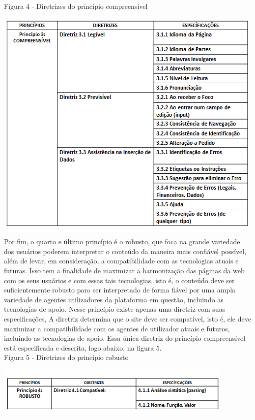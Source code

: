 \documentclass[a4paper]{article}
\begin{document}
\begin{titlepage}
Figura 4 - Diretrizes do princípio compreensível\\[-0.7cm]
\begin{center}
	\parbox{11cm}{\includegraphics[scale=0.8]{Compreensível.png}}
\end{center}

Por fim, o quarto e último princípio é o robusto, que foca na grande variedade dos usuários poderem interpretar o conteúdo da maneira mais confiável possível, além de levar, em consideração, a compatibilidade com as tecnologias atuais e futuras. Isso tem a finalidade de maximizar a harmonização das páginas da web com os seus usuários e com essas tais tecnologias, isto é, o conteúdo deve ser suficientemente robusto para ser interpretado de forma fiável por uma ampla variedade de agentes utilizadores da plataforma em questão, incluindo as tecnologias de apoio. Nesse princípio existe apenas uma diretriz com suas especificações, A diretriz determina que o site deve ser compatível, isto é, ele deve maximizar a compatibilidade com os agentes de utilizador atuais e futuros, incluindo as tecnologias de apoio. Essa única diretriz do princípio compreensível está especificada e descrita, logo abaixo, na figura 5.\\

Figura 5 - Diretrizes do princípio robusto\\[-0.7cm]
\begin{center}
	\parbox{11cm}{\includegraphics[scale=0.9]{Robusto.png}}
\end{center}


\end{titlepage}
\end{document}
